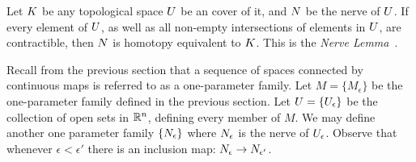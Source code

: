 Let $K$ be any topological space $U$ be an cover of it, and $N$ be the nerve of $U$. If every element of $U$, as well as all non-empty intersections of elements in $U$, are contractible, then $N$ is homotopy equivalent to $K$. This is the \emph{Nerve Lemma}~\cite{hatcher}.

Recall from the previous section that a sequence of spaces connected by continuous maps is referred to as a one-parameter family. Let $M = \{M_\epsilon\}$ be the one-parameter family defined in the previous section. Let $U = \{U_\epsilon\}$ be the collection of open sets in $\mathbb{R}^n$, defining every member of $M$. We may define another one parameter family $\{ N_\epsilon \}$ where $N_\epsilon$ is the nerve of $U_\epsilon$. Observe that whenever $\epsilon < \epsilon'$ there is an inclusion map: $N_\epsilon \rightarrow N_{\epsilon'}$.

